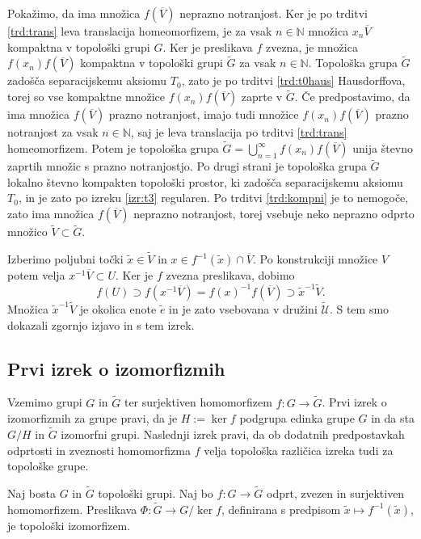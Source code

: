 \documentclass[mat1]{fmfdelo}
\newcommand{\N}{\mathbb N}
\newcommand{\Ucurl}{\mathcal{U}}
\newcommand{\closure}[1]{\overline{#1}}
\begin{document}
\begin{dokaz}
Pokažimo, da ima množica $f(\closure{V})$ neprazno notranjost. Ker je po trditvi \ref{trd:trans} leva translacija homeomorfizem, je za vsak $n \in \N$ množica $x_n\closure{V}$ kompaktna v topološki grupi $G$. Ker je preslikava $f$ zvezna, je množica $f(x_n)f(\closure{V})$ kompaktna v topološki grupi $\widetilde{G}$ za vsak $n \in \N$. Topološka grupa $\widetilde{G}$ zadošča separacijskemu aksiomu $T_0$, zato je po trditvi \ref{trd:t0haus} Hausdorffova, torej so vse kompaktne množice $f(x_n)f(\closure{V})$ zaprte v $\widetilde{G}$. Če predpostavimo, da ima množica $f(\closure{V})$ prazno notranjost, imajo tudi množice $f(x_n)f(\closure{V})$ prazno notranjost za vsak $n \in \N$, saj je leva translacija po trditvi \ref{trd:trans} homeomorfizem. Potem je topološka grupa $\widetilde{G} = \bigcup_{n=1}^\infty f(x_n)f(\closure{V})$ unija števno zaprtih množic s prazno notranjostjo. Po drugi strani je topološka grupa $\widetilde{G}$ lokalno števno kompakten topološki prostor, ki zadošča separacijskemu aksiomu $T_0$, in je zato po izreku \ref{izr:t3} regularen. Po trditvi \ref{trd:kompni} je to nemogoče, zato ima množica $f(\closure{V})$ neprazno notranjost, torej vsebuje neko neprazno odprto množico $\widetilde{V} \subset \widetilde{G}$.

Izberimo poljubni točki $\tilde{x} \in \widetilde{V}$ in $x \in f^{-1}(\tilde{x})\cap\closure{V}$.
Po konstrukciji množice $V$ potem velja $x^{-1}\closure{V} \subset U$. Ker je $f$ zvezna preslikava, dobimo
\[ f(U) \supset f(x^{-1}\closure{V}) = f(x)^{-1}f(\closure{V}) \supset \tilde{x}^{-1}\widetilde{V}. \]
Množica $\tilde{x}^{-1}\widetilde{V}$ je okolica enote $\tilde{e}$ in je zato vsebovana v družini $\widetilde{\Ucurl}$. S tem smo dokazali zgornjo izjavo in s tem izrek.
\end{dokaz}

\subsection{Prvi izrek o izomorfizmih}
Vzemimo grupi $G$ in $\widetilde{G}$ ter surjektiven homomorfizem $f\colon G \to \widetilde{G}$. Prvi izrek o izomorfizmih za grupe pravi, da je $H := \ker f$ podgrupa edinka grupe $G$ in da sta $G/H$ in $\widetilde{G}$ izomorfni grupi. Naslednji izrek pravi, da ob dodatnih predpostavkah odprtosti in zveznosti homomorfizma $f$ velja topološka različica izreka tudi za topološke grupe.
\begin{izrek}\label{izr:prvitopizrek}
Naj bosta $G$ in $\widetilde{G}$ topološki grupi. Naj bo $f\colon G \to \widetilde{G}$ odprt, zvezen in surjektiven homomorfizem. Preslikava $\Phi\colon\widetilde{G} \to G/\ker f$, definirana s predpisom $\tilde{x} \mapsto f^{-1}(\tilde{x})$, je topološki izomorfizem.
\end{izrek}
\end{document}
